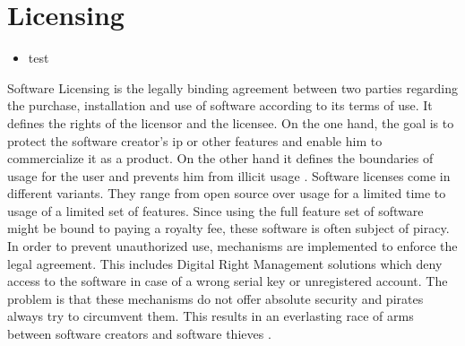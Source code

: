 \section{Licensing} \label{subsection:introduction-licensing}
\begin{itemize}
    \item test
\end{itemize}

Software Licensing is the legally binding agreement between two parties regarding the purchase, installation and use of software according to its terms of use.
It defines the rights of the licensor and the licensee.
On the one hand, the goal is to protect the software creator's \gls{ip} or other features and enable him to commercialize it as a product.
On the other hand it defines the boundaries of usage for the user and prevents him from illicit usage \cite{uncgLicensing}.
\newline
\newline
Software licenses come in different variants.
They range from open source over usage for a limited time to usage of a limited set of features.
Since using the full feature set of software might be bound to paying a royalty fee, these software is often subject of piracy.
In order to prevent unauthorized use, mechanisms are implemented to enforce the legal agreement.
This includes Digital Right Management solutions which deny access to the software in case of a wrong serial key or unregistered account.
\newline
\newline
The problem is that these mechanisms do not offer absolute security and pirates always try to circumvent them.
This results in an everlasting race of arms between software creators and software thieves \cite{szCopy}.
